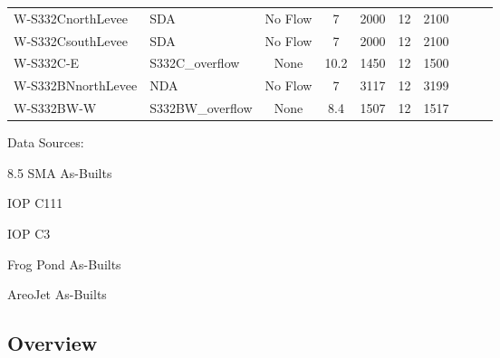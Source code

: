 \begin{table}[!h]
\begin{tabular}{llcccccccc}
W-S332CnorthLevee & SDA              & No Flow   &  7      & 2000    & 12    & 2100  &           &            \\
W-S332CsouthLevee & SDA              & No Flow   &  7      & 2000    & 12    & 2100  &           &            \\
W-S332C-E         & S332C\_overflow  & None      &  10.2   & 1450    & 12    & 1500  &           &            \\
W-S332BNnorthLevee& NDA              & No Flow   &  7      & 3117    & 12    & 3199  &           &            \\
W-S332BW-W        & S332BW\_overflow & None      &  8.4    & 1507    & 12    & 1517  &           &            \\
\hline
\end{tabular}
Data Sources:

8.5 SMA As-Builts

IOP C111

IOP C3

Frog Pond As-Builts

AreoJet As-Builts

\end{table}



\subsection{Overview}

\cleardoublepage


